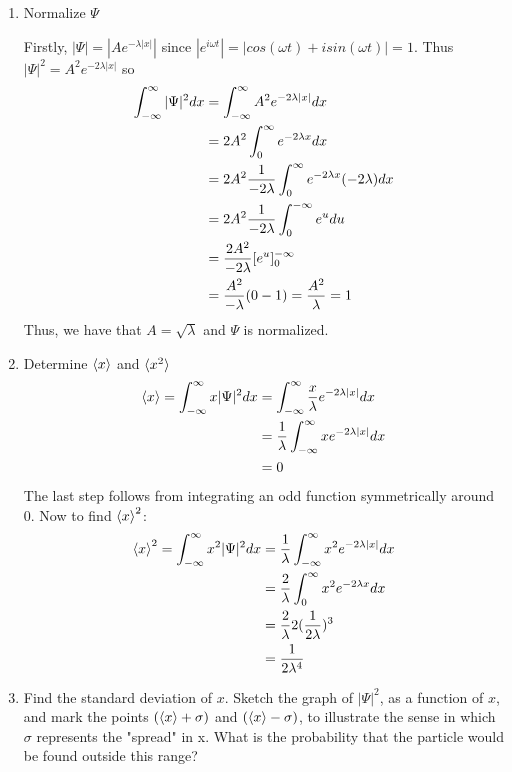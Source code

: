 \documentclass{article}
\begin{document}
  \begin{enumerate}[label=(\alph*)]
    \item Normalize $\Psi$

      Firstly, $|\Psi| = |Ae^{-\lambda|x|}|$ since $|e^{i\omega t}| = |cos(\omega t) + i sin(\omega t)| = 1$.
      Thus $|\Psi|^2 = A^2 e^{-2\lambda|x|}$ so
      \begin{align*}
        \int_{-\infty}^\infty |\Psi|^2 dx &= \int_{-\infty}^\infty A^2 e^{-2\lambda |x|} dx \\
                            &= 2A^2 \int_{0}^\infty e^{-2 \lambda x} dx \\
                            &= 2A^2 \frac{1}{-2\lambda} \int_{0}^\infty e^{-2 \lambda x} (-2 \lambda) dx \\
                            &= 2A^2 \frac{1}{-2\lambda} \int_{0}^{-\infty} e^{u}du \\
                            &= \frac{2A^2}{-2 \lambda} [e^u]_0^{-\infty} \\
                            &= \frac{A^2}{-\lambda} (0 - 1) = \frac{A^2}{\lambda} = 1
      \end{align*}
      Thus, we have that $A = \sqrt{\lambda}$ and $\Psi$ is normalized.

    \item Determine $\braket{x}$ and $\braket{x^2}$
      \begin{align*}
        \braket{x} = \int_{-\infty}^\infty x|\Psi|^2 dx &= \int_{-\infty}^\infty \frac{x}{\lambda} e^{-2\lambda|x|}dx \\
                             &= \frac1\lambda \int_{-\infty}^\infty x e^{-2 \lambda |x|} dx \\
                             &= 0 
      \end{align*}
      The last step follows from integrating an odd function symmetrically around 0. Now to find $\braket{x}^2$:
      \begin{align*}
        \braket{x}^2 = \int_{-\infty}^\infty x^2|\Psi|^2 dx &= \frac1\lambda \int_{-\infty}^\infty x^2 e^{-2\lambda|x|}dx \\
                                              &= \frac2\lambda \int_{0}^\infty x^2 e^{-2\lambda x} dx \\
                                              &= \frac2\lambda 2 (\frac1{2\lambda})^3 \\
                                              &= \frac1{2\lambda ^4} 
      \end{align*}

    \item Find the standard deviation of $x$. 
      Sketch the graph of $|\Psi|^2$, as a function of $x$, and mark the points $(\braket{x} + \sigma)$ and $(\braket{x} - \sigma)$, to illustrate the sense in which $\sigma$ represents the "spread" in x.
      What is the probability that the particle would be found outside this range?


\end{enumerate}
\end{document}
